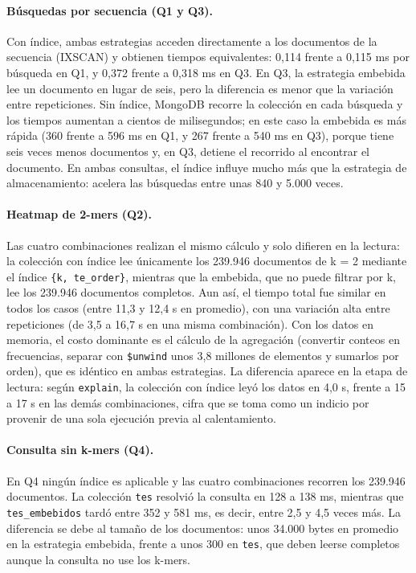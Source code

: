 \documentclass[unnumsec,namedate,webpdf,contemporary,large]{oup-authoring-template}
\begin{document}
\paragraph{B\'usquedas por secuencia (Q1 y Q3).}
Con \'indice, ambas estrategias acceden directamente a los documentos de la secuencia (IXSCAN) y obtienen tiempos equivalentes: 0,114 frente a 0,115 ms por b\'usqueda en Q1, y 0,372 frente a 0,318 ms en Q3. En Q3, la estrategia embebida lee un documento en lugar de seis, pero la diferencia es menor que la variaci\'on entre repeticiones. Sin \'indice, MongoDB recorre la colecci\'on en cada b\'usqueda y los tiempos aumentan a cientos de milisegundos; en este caso la embebida es m\'as r\'apida (360 frente a 596 ms en Q1, y 267 frente a 540 ms en Q3), porque tiene seis veces menos documentos y, en Q3, detiene el recorrido al encontrar el documento. En ambas consultas, el \'indice influye mucho m\'as que la estrategia de almacenamiento: acelera las b\'usquedas entre unas 840 y 5.000 veces.

\paragraph{Heatmap de 2-mers (Q2).}
Las cuatro combinaciones realizan el mismo c\'alculo y solo difieren en la lectura: la colecci\'on con \'indice lee \'unicamente los 239.946 documentos de k = 2 mediante el \'indice \texttt{\{k, te\_order\}}, mientras que la embebida, que no puede filtrar por k, lee los 239.946 documentos completos. Aun as\'i, el tiempo total fue similar en todos los casos (entre 11,3 y 12,4 s en promedio), con una variaci\'on alta entre repeticiones (de 3,5 a 16,7 s en una misma combinaci\'on). Con los datos en memoria, el costo dominante es el c\'alculo de la agregaci\'on (convertir conteos en frecuencias, separar con \texttt{\$unwind} unos 3,8 millones de elementos y sumarlos por orden), que es id\'entico en ambas estrategias. La diferencia aparece en la etapa de lectura: seg\'un \texttt{explain}, la colecci\'on con \'indice ley\'o los datos en 4,0 s, frente a 15 a 17 s en las dem\'as combinaciones, cifra que se toma como un indicio por provenir de una sola ejecuci\'on previa al calentamiento.

\paragraph{Consulta sin k-mers (Q4).}
En Q4 ning\'un \'indice es aplicable y las cuatro combinaciones recorren los 239.946 documentos. La colecci\'on \texttt{tes} resolvi\'o la consulta en 128 a 138 ms, mientras que \texttt{tes\_embebidos} tard\'o entre 352 y 581 ms, es decir, entre 2,5 y 4,5 veces m\'as. La diferencia se debe al tama\~no de los documentos: unos 34.000 bytes en promedio en la estrategia embebida, frente a unos 300 en \texttt{tes}, que deben leerse completos aunque la consulta no use los k-mers.
\end{document}
